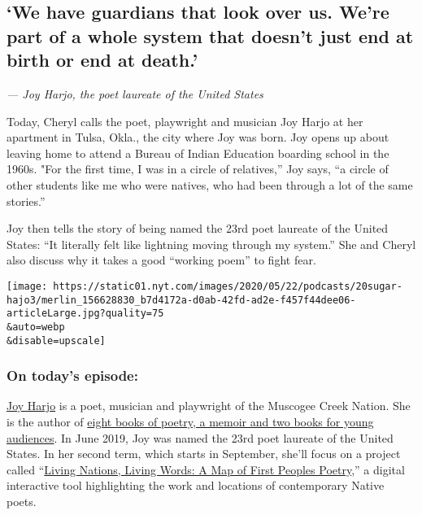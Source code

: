 \hypertarget{we-have-guardians-that-look-over-us-were-part-of-a-whole-system-that-doesnt-just-end-at-birth-or-end-at-death}{%
\subsection{`We have guardians that look over us. We're part of a whole
system that doesn't just end at birth or end at
death.'}\label{we-have-guardians-that-look-over-us-were-part-of-a-whole-system-that-doesnt-just-end-at-birth-or-end-at-death}}

\emph{--- Joy Harjo, the poet laureate of the United States}

Today, Cheryl calls the poet, playwright and musician Joy Harjo at her
apartment in Tulsa, Okla., the city where Joy was born. Joy opens up
about leaving home to attend a Bureau of Indian Education boarding
school in the 1960s. "For the first time, I was in a circle of
relatives,'' Joy says, ``a circle of other students like me who were
natives, who had been through a lot of the same stories.''

Joy then tells the story of being named the 23rd poet laureate of the
United States: ``It literally felt like lightning moving through my
system.'' She and Cheryl also discuss why it takes a good ``working
poem'' to fight fear.

\texttt{[image: https://static01.nyt.com/images/2020/05/22/podcasts/20sugar-hajo3/merlin\_156628830\_b7d4172a-d0ab-42fd-ad2e-f457f44dee06-articleLarge.jpg?quality=75\\\&auto=webp\\\&disable=upscale]}

\hypertarget{on-todays-episode}{%
\subsubsection{\texorpdfstring{\textbf{On today's
episode:}}{On today's episode:}}\label{on-todays-episode}}

\href{https://www.joyharjo.com/}{Joy Harjo} is a poet, musician and
playwright of the Muscogee Creek Nation. She is the author of
\href{https://www.nytimes.com/2019/06/19/books/joy-harjo-poet-laureate.html?searchResultPosition=3}{eight
books of poetry, a memoir and two books for young audiences}. In June
2019, Joy was named the 23rd poet laureate of the United States. In her
second term, which starts in September, she'll focus on a project called
``\href{https://www.nytimes.com/2020/04/30/books/joy-harjo-poet-laureate-second-term.html?searchResultPosition=1}{Living
Nations, Living Words: A Map of First Peoples Poetry},'' a digital
interactive tool highlighting the work and locations of contemporary
Native poets.

